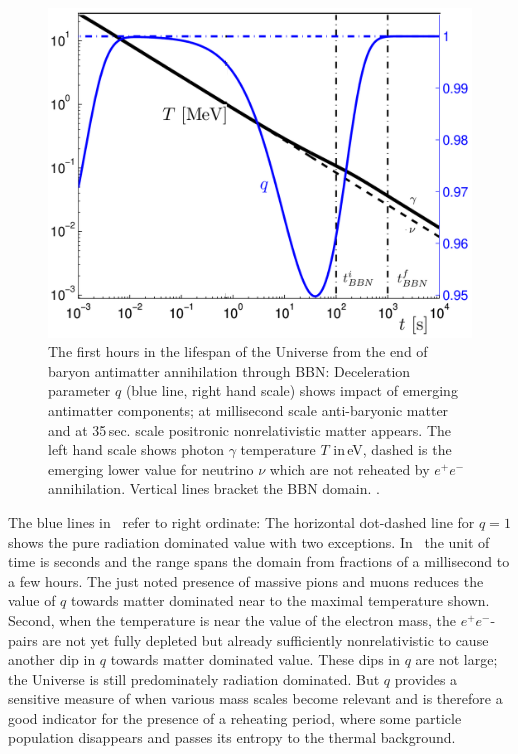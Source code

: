 \begin{figure}
\centerline{\includegraphics[width=0.90\linewidth]{01-introduction/Figures/TqBBN.png}}
\caption{The first hours in the lifespan of the Universe from the end of baryon antimatter annihilation through BBN: Deceleration parameter $q$ (blue line, right hand scale) shows impact of emerging antimatter components; at millisecond scale anti-baryonic matter and at 35\,sec. scale positronic nonrelativistic matter appears. The left hand scale shows photon $\gamma$ temperature $T$ in\,eV, dashed is the emerging lower value for neutrino $\nu$ which are not reheated by $e^+e^-$ annihilation. Vertical lines bracket the BBN domain. . } 
\label{fig:BBN}
\end{figure}

The blue lines in~ refer to right ordinate: The horizontal dot-dashed line for $q=1$ shows the pure radiation dominated value with two exceptions. In~ the unit of time is seconds and the range spans the domain from fractions of a millisecond to a few hours. The just noted presence of massive pions and muons reduces the value of $q$ towards matter dominated near to the maximal temperature shown. Second, when the temperature is near the value of the electron mass, the $e^+e^-$-pairs are not yet fully depleted but already sufficiently nonrelativistic to cause another dip in $q$ towards matter dominated value. These dips in $q$ are not large; the Universe is still predominately radiation dominated. But $q$ provides a sensitive measure of when various mass scales become relevant and is therefore a good indicator for the presence of a reheating period, where some particle population disappears and passes its entropy to the thermal background.

